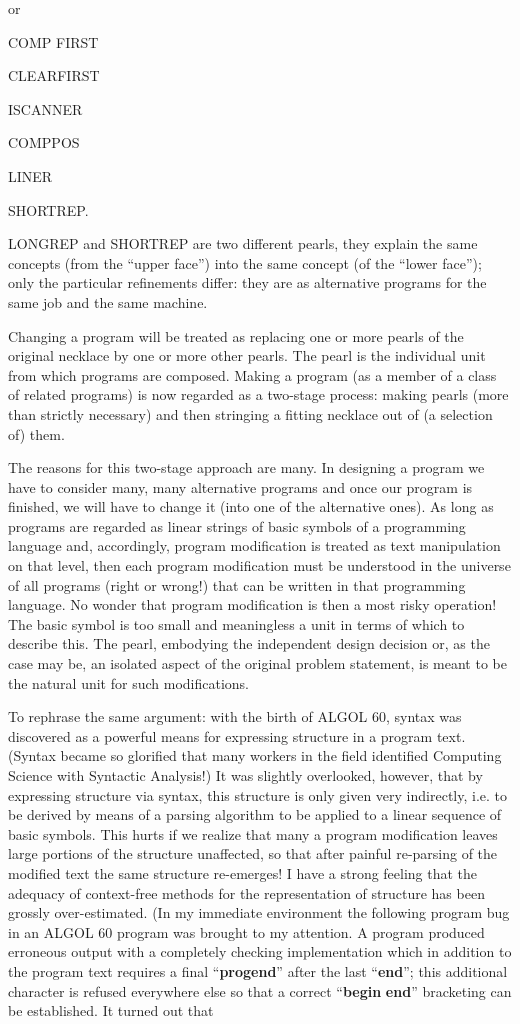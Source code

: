 \noindent
or

COMP FIRST

CLEARFIRST

ISCANNER

COMPPOS

LINER

SHORTREP.

LONGREP and SHORTREP are two different pearls, they explain the same concepts (from the ``upper face'') into the same concept (of the ``lower face''); only the particular refinements differ: they are as alternative programs for the same job and the same machine.

Changing a program will be treated as replacing one or more pearls of the original necklace by one or more other pearls. The pearl is the individual unit from which programs are composed. Making a program (as a member of a class of related programs) is now regarded as a two-stage process: making pearls (more than strictly necessary) and then stringing a fitting necklace out of (a selection of) them.

The reasons for this two-stage approach are many. In designing a program we have to consider many, many alternative programs and once our program is finished, we will have to change it (into one of the alternative ones). As long as programs are regarded as linear strings of basic symbols of a programming language and, accordingly, program modification is treated as text manipulation on that level, then each program modification must be understood in the universe of all programs (right or wrong!) that can be written in that programming language. No wonder that program modification is then a most risky operation! The basic symbol is too small and meaningless a unit in terms of which to describe this. The pearl, embodying the independent design decision or, as the case may be, an isolated aspect of the original problem statement, is meant to be the natural unit for such modifications.

To rephrase the same argument: with the birth of ALGOL 60, syntax was discovered as a powerful means for expressing structure in a program text. (Syntax became so glorified that many workers in the field identified Computing Science with Syntactic Analysis!) It was slightly overlooked, however, that by expressing structure via syntax, this structure is only given very indirectly, i.e. to be derived by means of a parsing algorithm to be applied to a linear sequence of basic symbols. This hurts if we realize that many a program modification leaves large portions of the structure unaffected, so that after painful re-parsing of the modified text the same structure re-emerges! I have a strong feeling that the adequacy of context-free methods for the representation of structure has been grossly over-estimated. (In my immediate environment the following program bug in an ALGOL 60 program was brought to my attention. A program produced erroneous output with a completely checking implementation which in addition to the program text requires a final ``\textbf{progend}'' after the last ``\textbf{end}''; this additional character is refused everywhere else so that a correct ``\textbf{begin} \textendash  \textbf{end}'' bracketing can be established. It turned out that

